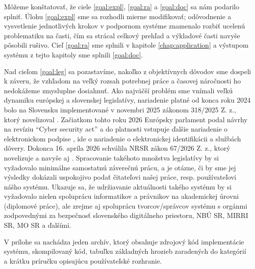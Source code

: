 Môžeme konštatovať, že ciele \ref{goal:expl}, \ref{goal:ra} a \ref{goal:doc} sa nám podarilo splniť. Úlohu \ref{goal:expl} sme sa rozhodli mierne
modifikovať; odôvodnenie a vysvetlenie jednotlivých krokov v podpornom systéme znamenalo rozbiť ucelenú problematiku na časti, čím sa strácal celkový
prehľad a výkladové časti navyše pôsobili rušivo. Cieľ \ref{goal:ra} sme splnili v kapitole \ref{chap:application} a výstupom systému z tejto kapitoly
sme splnili \ref{goal:doc}.

Nad cieľom \ref{goal:leg} sa pozastavíme, nakoľko z objektívnych dôvodov sme dospeli k záveru, že vzhľadom na veľký rozsah potrebnej práce a časovej
náročnosti ho nedokážeme zmysluplne dosiahnuť. Ako najväčší problém sme vnímali veľkú dynamiku európskej a slovenskej legislatívy, nariadenie \cite{NIS2}
platné od konca roku 2024 bolo na Slovensku implementované v novembri 2025 zákonom 318/2025 Z. z., ktorý novelizoval \cite{ZoKB}. Začiatkom tohto roku 2026
Európsky parlament podal návrhy na revíziu \enquote{Cyber security act} \cite{CSA2} a do platnosti vstupuje ďalšie nariadenie o elektronickom podpise
\cite{EIDAS2.0}, ide o nariadenie o elektronickej identifikácii a službách dôvery. Dokonca 16. apríla 2026 schválila NRSR zákon 67/2026 Z. z., ktorý
novelizuje \cite{ZoITVS} a navyše aj \cite{ZoKB}. Spracovanie takéhoto množstva legislatívy by si vyžadovalo minimálne samostatnú záverečnú prácu,
a je otázne, či by sme jej výsledky dokázali uspokojivo podať čitateľovi našej práce, resp. používateľovi nášho systému. Ukazuje sa, že udržiavanie
aktuálnosti takého systému by si vyžadovalo nielen spoluprácu informatikov a právnikov na akademickej úrovni (diplomové práce), ale zrejme aj spoluprácu
tvorcov/správcov systému s orgánmi zodpovednými za bezpečnosť slovenského digitálneho priestoru, NBÚ SR, MIRRI SR, MO SR a ďalšími.

V prílohe sa nachádza jeden archív, ktorý obsahuje zdrojový kód implementácie systému, skompilovaný kód, tabuľku základných hrozieb \cite{GSK} zaradených
do kategórií \cite{27005} a krátku príručku opisujúcu používateľské rozhranie.
